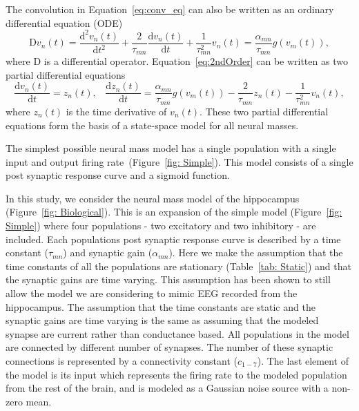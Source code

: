 The convolution in Equation~\ref{eq:conv_eq} can also be written as an ordinary differential equation (ODE)
\begin{equation}\label{eq:2ndOrder}
    \mathrm{D}v_n(t) = \frac{\mathrm{d}^2 v_n(t)}{\mathrm{d}t^2} + \frac{2}{\tau_{mn}}\frac{\mathrm{d} v_n(t)}{\mathrm{d}t} + \frac{1}{\tau_{mn}^2} v_n(t) = \frac{\alpha_{mn}}{\tau_{mn}} g(v_m(t)),
\end{equation}
where $\mathrm{D}$ is a differential operator. Equation~\ref{eq:2ndOrder} can be written as two partial differential equations
\begin{equation} \label{eq:2ndOrderNMM}
    \frac{\mathrm{d} v_n(t)}{\mathrm{d}t} = z_n(t),\,\,\,\,\,    \frac{\mathrm{d}z_n(t)}{\mathrm{d}t} = \frac{\alpha_{mn}}{\tau_{mn}} g(v_m(t)) - \frac{2}{\tau_{mn}}z_n(t) - \frac{1}{\tau_{mn}^2} v_n(t),
\end{equation}
where $z_n(t)$ is the time derivative of $v_n(t)$. These two partial differential equations form the basis of a state-space model for all neural masses.

The simplest possible neural mass model has a single population with a single input and output firing rate~(Figure~\ref{fig: Simple}). This model consists of a single post synaptic response curve and a sigmoid function.

In this study, we consider the neural mass model of the hippocampus (Figure~\ref{fig: Biological}). This is an expansion of the simple model (Figure~\ref{fig: Simple}) where four populations - two excitatory and two inhibitory - are included. Each populations post synaptic response curve is described by a time constant ($\tau_{mn}$) and synaptic gain ($\alpha_{mn}$). Here we make the assumption that the time constants of all the populations are stationary (Table~\ref{tab: Static}) and that the synaptic gains are time varying. This assumption has been shown to still allow the model we are considering to mimic EEG recorded from the hippocampus. The assumption that the time constants are static and the synaptic gains are time varying is the same as assuming that the modeled synapse are current rather than conductance based. All populations in the model are connected by different number of synapses. The number of these synaptic connections is represented by a connectivity constant ($c_{1-7}$). The last element of the model is its input which represents the firing rate to the modeled population from the rest of the brain, and is modeled as a Gaussian noise source with a non-zero mean.

